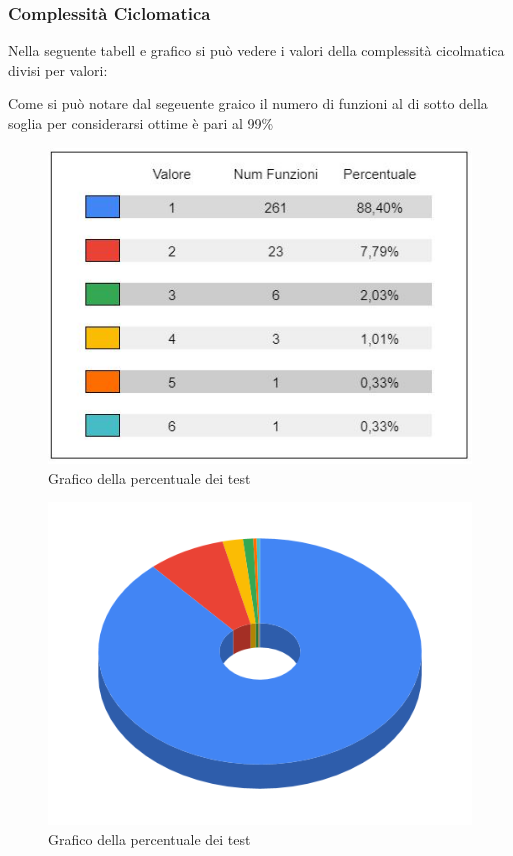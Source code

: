 \subsubsection{Complessità Ciclomatica}
    Nella seguente tabell e grafico si può vedere i valori della complessità cicolmatica divisi per valori:

        Come si può notare dal segeuente graico il numero di funzioni al di sotto della soglia per considerarsi ottime è pari al 99\%



    \begin{figure}[H]
        \centering
        \includegraphics[width=10 cm]{source/sections/images/tabella_CC.JPG}
        \caption{Grafico della percentuale dei test}
    \end{figure}

    \begin{figure}[H]
        \centering
        \includegraphics[width=10 cm]{source/sections/images/CC.png}
        \caption{Grafico della percentuale dei test}
    \end{figure}

